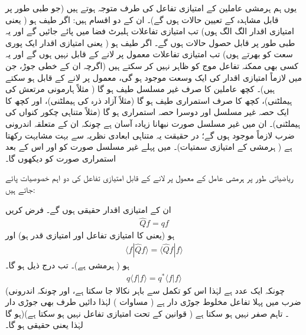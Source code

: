 
یوں ہم  ہرمشی عاملین کے امتیازی تفاعل کی طرف متوجہ ہوتے ہیں (جو    طبی طور پر  قابل مشاہدہ  کے تعیین حالات ہوں گے)۔  ان کے دو اقسام ہیں:   اگر  طیف  ہو ( یعنی امتیازی اقدار الگ الگ ہوں)   تب امتیازی تفاعلات ہلبرٹ  فضا  میں پائے جائیں گے   اور یہ طبی طور پر قابل حصول حالات  ہوں گے۔  اگر طیف  ہو  (  یعنی امتیازی اقدار ایک  پوری سعت  کو بھرتے ہوں)  تب امتیازی تفاعلات معمول پر لانے کے قابل نہیں ہوں گے   اور یہ کسی بھی ممکنہ تفاعل موج کو ظاہر نہیں کر سکتے ہیں (اگرچہ   ان کے  خطی جوڑ،  جن میں  لازماً  امتیازی اقدار کی ایک وسعت موجود ہو گی،  معمول پر لانے کے قابل ہو سکتے ہیں)۔  کچھ  عاملین کا صرف غیر مسلسل طیف ہو گا (  مثلاً   ہارمونی مرتعش کی ہیملٹنی)،   کچھ  کا صرف استمراری  طیف  ہو گا (مثلاً  آزاد ذرہ کی ہیملٹنی)،   اور کچھ  کا  ایک  حصہ غیر مسلسل اور دوسرا  حصہ استمراری ہو گا (مثلاً متناہی  چکور کنواں کی  ہیملٹنی)۔  ان میں   غیر مسلسل صورت نبھانا زیادہ آسان ہے چونکہ ان کے متعلقہ اندرونی ضرب لازماً موجود ہوں گے؛   در حقیقت یہ متناہی ابعادی نظریہ سے بہت مشابہت رکھتا ہے (  ہرمشی  کے امتیازی سمتیات)۔  میں پہلے غیر مسلسل صورت کو  اور اس کے بعد  استمراری  صورت کو دیکھوں گا۔  

ریاضیاتی طور پر ہرمشی عامل کے معمول پر لانے کے قابل امتیازی تفاعل کی دو اہم خصوصیات پائے جاتے  ہیں:
  
ان کے امتیازی اقدار حقیقی ہوں گے۔  
 فرض کریں
\begin{align*}
\hat{Q}f = qf 
\end{align*}
ہو (یعنی    کا امتیازی تفاعل     اور  امتیازی قدر  ہو)       اور 
\begin{align*}
\langle f | \hat{Q}  f \rangle = \langle \hat{Q} f | f  \rangle
\end{align*}
ہو ( ہرمشی ہے)۔  تب درج ذیل ہو گا۔
\begin{align*}
q\langle f \left\vert f \right.  \rangle = q^{*} \langle f \left\vert f \right. \rangle
\end{align*}
(چونکہ  ایک عدد ہے  لہٰذا  اس کو  تکمل سے باہر نکالا   جا سکتا ہے،   اور چونکہ اندرونی ضرب میں پہلا تفاعل مخلوط جوڑی دار ہے ( مساوات  )   لہٰذا  دائیں طرف   بھی جوڑی دار ہو گا)۔ تاہم    صفر نہیں ہو سکتا ہے (  قوانین کے تحت  امتیازی تفاعل نہیں ہو سکتا ہے) لہٰذا    یعنی   حقیقی ہو گا۔


